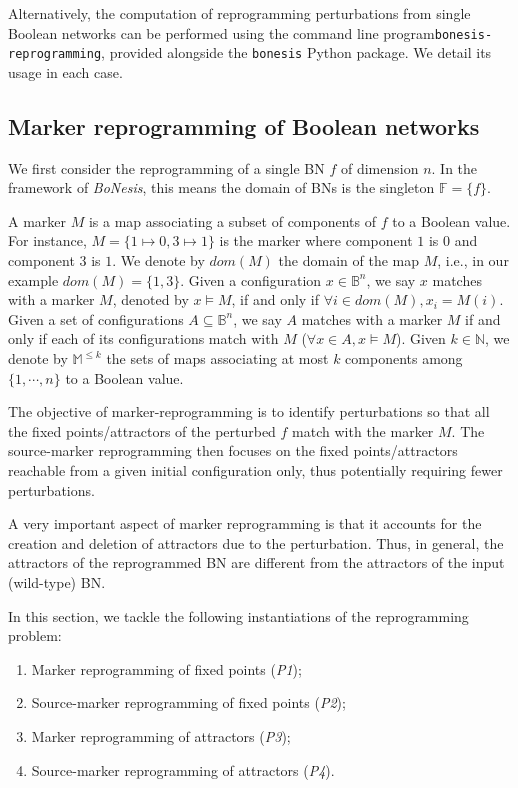 \documentclass[PCJ,Unicode,screen,mode=plain]{cedram}
\begin{document}
Alternatively, the computation of reprogramming perturbations from
single Boolean networks can be performed using the command line
program\texttt{bonesis-reprogramming}, provided alongside the
\texttt{bonesis} Python package. We detail its usage in each case.
\hypertarget{marker-reprogramming-of-boolean-networks}{%
\subsection{Marker reprogramming of Boolean
networks}\label{marker-reprogramming-of-boolean-networks}}

We first consider the reprogramming of a single BN \(f\) of dimension
\(n\). In the framework of \emph{BoNesis}, this means the domain of BNs
is the singleton \(\mathbb F = \{ f \}\).

A marker \(M\) is a map associating a subset of components of \(f\) to a
Boolean value. For instance, \(M = \{ 1\mapsto 0, 3\mapsto 1\}\) is the
marker where component \(1\) is \(0\) and component \(3\) is \(1\). We
denote by \(dom(M)\) the domain of the map \(M\), i.e., in our example
\(dom(M) = \{ 1, 3\}\). Given a configuration \(x\in \mathbb B^n\), we
say \(x\) matches with a marker \(M\), denoted by \(x\models M\), if and
only if \(\forall i\in dom(M), x_i=M(i)\). Given a set of configurations
\(A\subseteq \mathbb B^n\), we say \(A\) matches with a marker \(M\) if
and only if each of its configurations match with \(M\)
(\(\forall x\in A, x\models M\)). Given \(k\in\mathbb N\), we denote by
\(\mathbb M^{\leq k}\) the sets of maps associating at most \(k\)
components among \(\{1, \cdots, n\}\) to a Boolean value.

The objective of marker-reprogramming is to identify perturbations so
that all the fixed points/attractors of the perturbed \(f\) match with
the marker \(M\). The source-marker reprogramming then focuses on the
fixed points/attractors reachable from a given initial configuration
only, thus potentially requiring fewer perturbations.

A very important aspect of marker reprogramming is that it accounts for
the creation and deletion of attractors due to the perturbation. Thus,
in general, the attractors of the reprogrammed BN are different from the
attractors of the input (wild-type) BN.

In this section, we tackle the following instantiations of the
reprogramming problem:

\begin{enumerate}
\def\labelenumi{\arabic{enumi}.}
\item
  Marker reprogramming of fixed points (\emph{P1});
\item
  Source-marker reprogramming of fixed points (\emph{P2});
\item
  Marker reprogramming of attractors (\emph{P3});
\item
  Source-marker reprogramming of attractors (\emph{P4}).
\end{enumerate}
\end{document}
